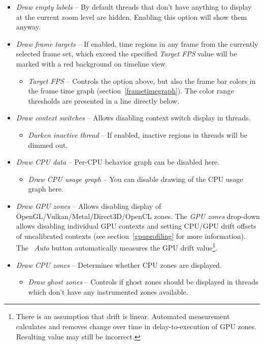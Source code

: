 \documentclass[hidelinks,titlepage,a4paper,twoside]{article}
\begin{document}
\begin{itemize}
\item \emph{\faExpand{} Draw empty labels} -- By default threads that don't have anything to display at the current zoom level are hidden. Enabling this option will show them anyway.
\item \emph{\faFlagCheckered{} Draw frame targets} -- If enabled, time regions in any frame from the currently selected frame set, which exceed the specified \emph{Target FPS} value will be marked with a red background on timeline view.
\begin{itemize}
\item \emph{Target FPS} -- Controls the option above, but also the frame bar colors in the frame time graph (section~\ref{frametimegraph}). The color range thresholds are presented in a line directly below.
\end{itemize}
\item \emph{\faPersonHiking{} Draw context switches} -- Allows disabling context switch display in threads.
\begin{itemize}
\item \emph{\faMoon{} Darken inactive thread} -- If enabled, inactive regions in threads will be dimmed out.
\end{itemize}
\item \emph{\faSliders{} Draw CPU data} -- Per-CPU behavior graph can be disabled here.
\begin{itemize}
\item \emph{\faSignature{} Draw CPU usage graph} -- You can disable drawing of the CPU usage graph here.
\end{itemize}
\item \emph{\faEye{} Draw GPU zones} -- Allows disabling display of OpenGL/Vulkan/Metal/Direct3D/OpenCL zones. The \emph{GPU zones} drop-down allows disabling individual GPU contexts and setting CPU/GPU drift offsets of uncalibrated contexts (see section~\ref{gpuprofiling} for more information). The \emph{\faRobot~Auto} button automatically measures the GPU drift value\footnote{There is an assumption that drift is linear. Automated measurement calculates and removes change over time in delay-to-execution of GPU zones. Resulting value may still be incorrect.}.
\item \emph{\faMicrochip{} Draw CPU zones} -- Determines whether CPU zones are displayed.
\begin{itemize}
\item \emph{\faGhost{} Draw ghost zones} -- Controls if ghost zones should be displayed in threads which don't have any instrumented zones available.

\end{itemize}
\end{itemize}
\end{document}
